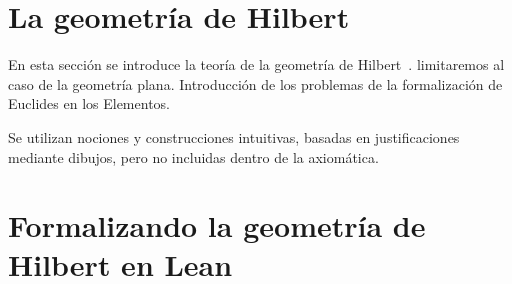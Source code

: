 \documentclass[12pt, spanish]{TFG}
\begin{document}
\newpage
\section{La geometría de Hilbert}

En esta sección se introduce la teoría de la geometría de
Hilbert~\cite{hilbert1902grundlagenfoundations}.
limitaremos al caso de la geometría plana. Introducción de los problemas de la
formalización de Euclides en los Elementos.

Se utilizan nociones y construcciones intuitivas, basadas en justificaciones
mediante dibujos, pero no incluidas dentro de la axiomática.


\newpage
\section{Formalizando la geometría de Hilbert en Lean}

\newpage
{}

\end{document}
